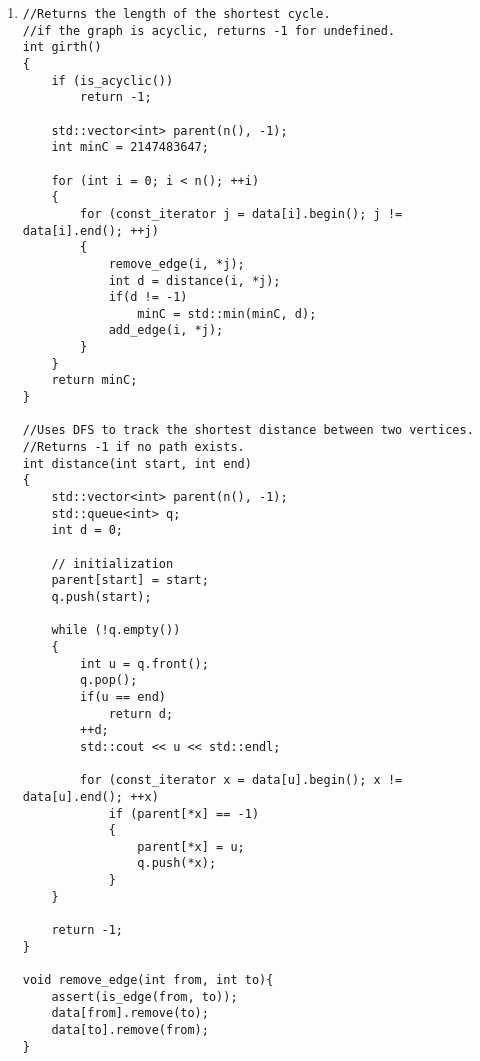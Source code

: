 \documentclass{article}
\begin{document}
\begin{enumerate}
\begin{lstlisting}
    for (const_iterator x = data[start].begin(); x != data[start].end(); ++x)
    {
        if (parent[*x] == -1)
        {
            parent[*x] = start;
            color[*x] = !color[start];
            dfs1(*x, parent, first, last, time, color);
        }
        else if (color[*x] == color[start])
                bipartite = false;
    }

    last[start] = time++;
}

void dfs()
{
    std::vector<int> parent(n(), -1);
    std::vector<int> first(n(), -1);
    std::vector<int> last(n(), -1);
    std::vector<bool> color(n());

    int time = 0;
    int ncc = 0;

    for (int start = 0; start < n(); ++start)
    {
        if (parent[start] == -1)
        {
            parent[start] = start;
            color[start] = true;
            dfs1(start, parent, first, last, time, color);
            ++ncc;
        }
    }
}

bool is_bipartite()
{
    bipartite = true;
    dfs();

    return bipartite;
}
        \end{lstlisting}

    \item
        \begin{lstlisting}
//Returns the length of the shortest cycle. 
//if the graph is acyclic, returns -1 for undefined.
int girth()
{
    if (is_acyclic())
        return -1;

    std::vector<int> parent(n(), -1);
    int minC = 2147483647;

    for (int i = 0; i < n(); ++i)
    {
        for (const_iterator j = data[i].begin(); j != data[i].end(); ++j)
        {
            remove_edge(i, *j);
            int d = distance(i, *j);
            if(d != -1)
                minC = std::min(minC, d);
            add_edge(i, *j);
        }
    }
    return minC;
}

//Uses DFS to track the shortest distance between two vertices.
//Returns -1 if no path exists.
int distance(int start, int end) 
{
    std::vector<int> parent(n(), -1);
    std::queue<int> q;
    int d = 0;
    
    // initialization
    parent[start] = start;
    q.push(start);

    while (!q.empty())
    {
        int u = q.front();	
        q.pop();
        if(u == end)
            return d;
        ++d;
        std::cout << u << std::endl;

        for (const_iterator x = data[u].begin(); x != data[u].end(); ++x)
            if (parent[*x] == -1)
            {
                parent[*x] = u;
                q.push(*x);
            }
    }

    return -1;
}

void remove_edge(int from, int to){
    assert(is_edge(from, to));
    data[from].remove(to);
    data[to].remove(from);
}
        \end{lstlisting}
    \end{enumerate}
\end{document}
